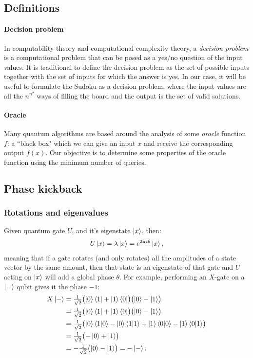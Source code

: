 \documentclass{article}
\begin{document}
\subsection{Definitions}

\paragraph{Decision problem}
In computability theory and computational complexity theory, a
\emph{decision  problem} is a computational problem that can be posed as a
yes/no question of the input values.
It is traditional to define the decision problem as the set of possible inputs
together with the set of inputs for which the answer is yes.
In our case, it will be useful to formulate the Sudoku as a decision problem,
where the input values are all the $n^{n^2}$ ways of filling the board and the
output is the set of valid solutions.

\paragraph{Oracle}
Many quantum algorithms are based around the analysis of some \emph{oracle}
function $f$: a ``black box" which we can give an input $x$
and receive the corresponding output $f(x)$.
Our objective is to determine some properties of the oracle function using the
minimum number of queries.

\subsection{Phase kickback}
\subsubsection{Rotations and eigenvalues}
Given quantum gate $U$, and it's eigenstate $\ket{x}$, then:
\[
  U \ket{x} = \lambda \ket{x} = e^{2 \pi i \theta} \ket{x},
\]
meaning that if a gate rotates (and only rotates) all the amplitudes of a state
vector by the same amount, then that state is an eigenstate of that gate and
$U$ acting on $\ket{x}$ will add a global phase $\theta$.
For example, performing an $X$-gate on a $\ket{-}$ qubit gives it the phase
$-1$:
\begin{align*}
  X \ket{-}
  & = \tfrac{1}{\sqrt{2}}  \bigl( \ket{0}\bra{1} + \ket{1}\bra{0} \bigr)
      \bigl( \ket{0} - \ket{1} \bigr) \\
  & = \tfrac{1}{\sqrt{2}} \bigl( \ket{0}\bra{1} + \ket{1}\bra{0} \bigr)
      \bigl( \ket{0} - \ket{1} \bigr) \\
  & = \tfrac{1}{\sqrt{2}} \bigl( \ket{0}\braket{1|0} - \ket{0}\braket{1|1}
     + \ket{1}\braket{0|0} - \ket{1}\braket{0|1}  \bigr) \\
  & = \tfrac{1}{\sqrt{2}} \bigl( -\ket{0}  + \ket{1} \bigr) \\
  & =  - \tfrac{1}{\sqrt{2}} \bigl( \ket{0}  - \ket{1} \bigr) = - \ket{-}.
\end{align*}
\end{document}
